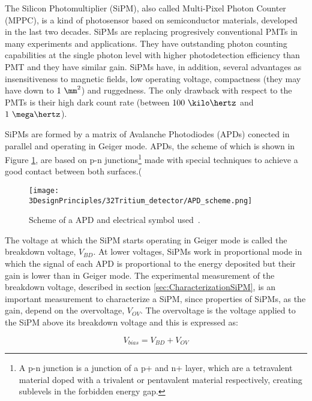 The Silicon Photomultiplier (SiPM), also called Multi-Pixel Photon Counter (MPPC), is a kind of photosensor based on semiconductor materials, developed in the last two decades. SiPMs are replacing progresively conventional PMTs in many experiments and applications. They have outstanding photon counting capabilities at the single photon level with higher photodetection efficiency than PMT and they have similar gain. SiPMs have, in addition, several advantages as insensitiveness to magnetic fields, low operating voltage, compactness (they may have down to $1~\mm^2$) and ruggedness. The only drawback with respect to the PMTs is their high dark count rate (between $100~\kilo\hertz$ and $1~\mega\hertz$).

SiPMs are formed by a matrix of Avalanche Photodiodes (APDs) conected in parallel and operating in Geiger mode. APDs, the scheme of which is shown in Figure \ref{fig:SchemeAPD}, are based on p-n junctions\footnote{A p-n junction is a junction of a p+ and n+ layer, which are a tetravalent material doped with a trivalent or pentavalent material respectively, creating sublevels in the forbidden energy gap.} made with special techniques to achieve a good contact between both surfaces.(

\begin{figure}[htbp]
\centering
\texttt{[image: 3DesignPrinciples/32Tritium\_detector/APD\_scheme.png]}
\caption{Scheme of a APD and electrical symbol used\label{fig:SchemeAPD}~\cite{OSI}.}
\end{figure}
 

The voltage at which the SiPM starts operating in Geiger mode is called the breakdown voltage, $V_ {BD}$. At lower voltages, SiPMs work in proportional mode in which the signal of each APD is proportional to the energy deposited but their gain is lower than in Geiger mode. The experimental measurement of the breakdown voltage, described in section \ref{sec:CharacterizationSiPM}, is an important measurement to characterize a SiPM, since properties of SiPMs, as the gain, depend on the overvoltage, $V_{OV}$. The overvoltage is the voltage applied to the SiPM above its breakdown voltage and this is expressed as:

\begin{equation}
V_{bias}=V_{BD}+V_{OV}
\label{overvoltage}
\end{equation}

